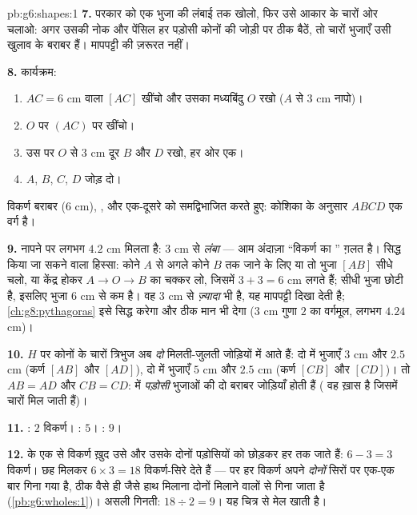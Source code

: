 \begin{solution}{pb:g6:shapes:1}
\textbf{7.} परकार को एक भुजा की लंबाई तक खोलो, फिर उसे आकार के
चारों ओर चलाओ: अगर उसकी नोक और पेंसिल हर पड़ोसी कोनों की जोड़ी पर
ठीक बैठें, तो चारों भुजाएँ उसी खुलाव के बराबर हैं। मापपट्टी की
ज़रूरत नहीं।

\textbf{8.} कार्यक्रम:
\begin{enumerate}
  \item $AC = 6$ cm वाला  $[AC]$ खींचो और उसका
        मध्यबिंदु $O$ रखो ($A$ से $3$ cm नापो)।
  \item $O$ पर $(AC)$ पर  खींचो।
  \item उस पर $O$ से $3$ cm दूर $B$ और $D$ रखो, हर ओर एक।
  \item $A$, $B$, $C$, $D$ जोड़ दो।
\end{enumerate}
विकर्ण बराबर ($6$ cm), , और एक-दूसरे को समद्विभाजित करते हुए:
कोशिका के अनुसार $ABCD$ एक वर्ग है।

\textbf{9.} नापने पर लगभग $4.2$ cm मिलता है: $3$ cm से
\emph{लंबा} --- आम अंदाज़ा ``विकर्ण का '' ग़लत है। सिद्ध
किया जा सकने वाला हिस्सा: कोने $A$ से अगले कोने $B$ तक जाने के
लिए या तो भुजा $[AB]$ सीधे चलो, या केंद्र होकर
$A \to O \to B$ का चक्कर लो, जिसमें $3 + 3 = 6$ cm लगते हैं;
सीधी भुजा छोटी है, इसलिए भुजा $6$ cm से कम है।
वह $3$ cm से \emph{ज़्यादा} भी है, यह मापपट्टी दिखा देती है;
\cref{ch:g8:pythagoras} इसे सिद्ध करेगा और ठीक मान भी देगा
($3$ cm गुणा $2$ का वर्गमूल, लगभग $4.24$ cm)।

\textbf{10.} $H$ पर कोनों के चारों त्रिभुज अब \emph{दो} मिलती-जुलती
जोड़ियों में आते हैं: दो में भुजाएँ $3$ cm और $2.5$ cm
(कर्ण $[AB]$ और $[AD]$), दो में भुजाएँ $5$ cm और
$2.5$ cm (कर्ण $[CB]$ और $[CD]$)। तो $AB = AD$ और
$CB = CD$:  में \emph{पड़ोसी} भुजाओं की दो बराबर जोड़ियाँ
होती हैं ( वह ख़ास  है जिसमें चारों मिल जाती हैं)।

\textbf{11.} : $2$ विकर्ण। : $5$।
: $9$।

\textbf{12.}  के एक  से विकर्ण ख़ुद उसे और उसके दोनों
पड़ोसियों को छोड़कर हर  तक जाते हैं: $6 - 3 = 3$
विकर्ण। छह  मिलकर $6 \times 3 = 18$ विकर्ण-सिरे देते हैं
--- पर हर विकर्ण अपने \emph{दोनों} सिरों पर एक-एक बार गिना गया
है, ठीक वैसे ही जैसे हाथ मिलाना दोनों मिलाने वालों से गिना जाता
है (\cref{pb:g6:wholes:1})। असली गिनती:
$18 \div 2 = 9$। यह चित्र से मेल खाती है।


\end{solution}

